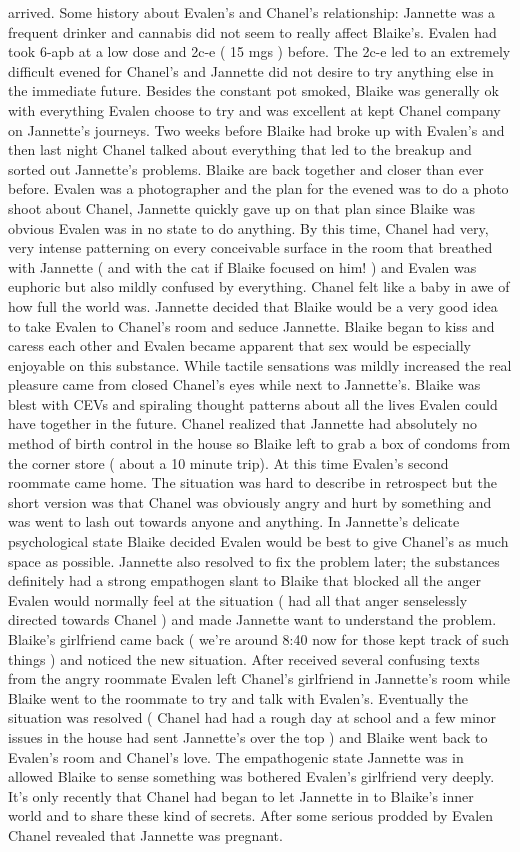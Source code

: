 \documentclass[12pt]{book}
\begin{document}
arrived. Some history about Evalen's and Chanel's relationship: Jannette was a frequent drinker and cannabis did not seem to really affect Blaike's. Evalen had took 6-apb at a low dose and 2c-e ( 15 mgs ) before. The 2c-e led to an extremely difficult evened for Chanel's and Jannette did not desire to try anything else in the immediate future. Besides the constant pot smoked, Blaike was generally ok with everything Evalen choose to try and was excellent at kept Chanel company on Jannette's journeys. Two weeks before Blaike had broke up with Evalen's and then last night Chanel talked about everything that led to the breakup and sorted out Jannette's problems. Blaike are back together and closer than ever before. Evalen was a photographer and the plan for the evened was to do a photo shoot about Chanel, Jannette quickly gave up on that plan since Blaike was obvious Evalen was in no state to do anything. By this time, Chanel had very, very intense patterning on every conceivable surface in the room that breathed with Jannette ( and with the cat if Blaike focused on him! ) and Evalen was euphoric but also mildly confused by everything. Chanel felt like a baby in awe of how full the world was. Jannette decided that Blaike would be a very good idea to take Evalen to Chanel's room and seduce Jannette. Blaike began to kiss and caress each other and Evalen became apparent that sex would be especially enjoyable on this substance. While tactile sensations was mildly increased the real pleasure came from closed Chanel's eyes while next to Jannette's. Blaike was blest with CEVs and spiraling thought patterns about all the lives Evalen could have together in the future. Chanel realized that Jannette had absolutely no method of birth control in the house so Blaike left to grab a box of condoms from the corner store ( about a 10 minute trip). At this time Evalen's second roommate came home. The situation was hard to describe in retrospect but the short version was that Chanel was obviously angry and hurt by something and was went to lash out towards anyone and anything. In Jannette's delicate psychological state Blaike decided Evalen would be best to give Chanel's as much space as possible. Jannette also resolved to fix the problem later; the substances definitely had a strong empathogen slant to Blaike that blocked all the anger Evalen would normally feel at the situation ( had all that anger senselessly directed towards Chanel ) and made Jannette want to understand the problem. Blaike's girlfriend came back ( we're around 8:40 now for those kept track of such things ) and noticed the new situation. After received several confusing texts from the angry roommate Evalen left Chanel's girlfriend in Jannette's room while Blaike went to the roommate to try and talk with Evalen's. Eventually the situation was resolved ( Chanel had had a rough day at school and a few minor issues in the house had sent Jannette's over the top ) and Blaike went back to Evalen's room and Chanel's love. The empathogenic state Jannette was in allowed Blaike to sense something was bothered Evalen's girlfriend very deeply. It's only recently that Chanel had began to let Jannette in to Blaike's inner world and to share these kind of secrets. After some serious prodded by Evalen Chanel revealed that Jannette was pregnant. 
\end{document}
